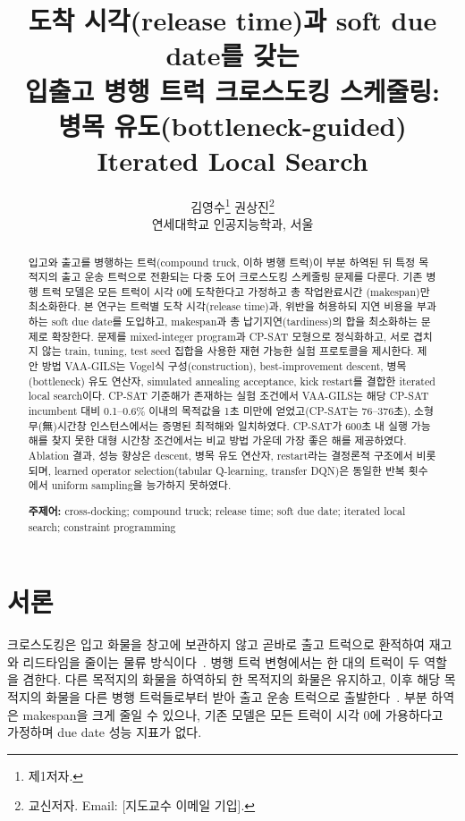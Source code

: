 \documentclass[11pt,a4paper]{article}
\title{\vspace{-8mm}\textbf{도착 시각(release time)과 soft due date를 갖는\\
입출고 병행 트럭 크로스도킹 스케줄링:\\
병목 유도(bottleneck-guided) Iterated Local Search}}
\author{김영수\thanks{제1저자.} \quad 권상진\thanks{교신저자. Email: [지도교수 이메일 기입].}\\
\small 연세대학교 인공지능학과, 서울}
\date{}
\begin{document}
\maketitle
\vspace{-4mm}

\begin{abstract}
\noindent
입고와 출고를 병행하는 트럭(compound truck, 이하 병행 트럭)이 부분 하역된 뒤 특정 목적지의
출고 운송 트럭으로 전환되는 다중 도어 크로스도킹 스케줄링 문제를 다룬다.
기존 병행 트럭 모델은 모든 트럭이 시각 0에 도착한다고 가정하고 총 작업완료시간
(makespan)만 최소화한다. 본 연구는 트럭별 도착 시각(release time)과, 위반을 허용하되
지연 비용을 부과하는 soft due date를 도입하고, makespan과 총 납기지연(tardiness)의
합을 최소화하는 문제로 확장한다. 문제를 mixed-integer
program과 CP-SAT 모형으로 정식화하고, 서로 겹치지 않는 train, tuning, test seed 집합을 사용한 재현 가능한
실험 프로토콜을 제시한다. 제안 방법 VAA-GILS는 Vogel식 구성(construction),
best-improvement descent, 병목(bottleneck) 유도 연산자, simulated annealing
acceptance, kick restart를 결합한 iterated local search이다. CP-SAT 기준해가
존재하는 실험 조건에서 VAA-GILS는 해당 CP-SAT incumbent 대비 0.1--0.6\% 이내의 목적값을 1초
미만에 얻었고(CP-SAT는 76--376초), 소형 무(無)시간창 인스턴스에서는 증명된
최적해와 일치하였다. CP-SAT가 600초 내 실행 가능해를 찾지 못한 대형 시간창
조건에서는 비교 방법 가운데 가장 좋은 해를 제공하였다. Ablation 결과, 성능 향상은
descent, 병목 유도 연산자, restart라는 결정론적 구조에서 비롯되며, learned
operator selection(tabular Q-learning, transfer DQN)은 동일한 반복 횟수에서 uniform
sampling을 능가하지 못하였다.

\smallskip
\noindent\textbf{주제어:} cross-docking; compound truck; release time; soft due date;
iterated local search; constraint programming
\end{abstract}

\section{서론}

크로스도킹은 입고 화물을 창고에 보관하지 않고 곧바로 출고 트럭으로 환적하여
재고와 리드타임을 줄이는 물류 방식이다~\cite{boysen2010,vanbelle2012}. 병행 트럭 변형에서는 한 대의 트럭이 두 역할을 겸한다. 다른 목적지의 화물을 하역하되
한 목적지의 화물은 유지하고, 이후 해당 목적지의 화물을 다른 병행 트럭들로부터 받아
출고 운송 트럭으로 출발한다~\cite{joo2013,shahmardan2020}. 부분 하역은 makespan을 크게
줄일 수 있으나, 기존 모델은 모든 트럭이 시각 0에 가용하다고 가정하며 due date
성능 지표가 없다.
\end{document}
